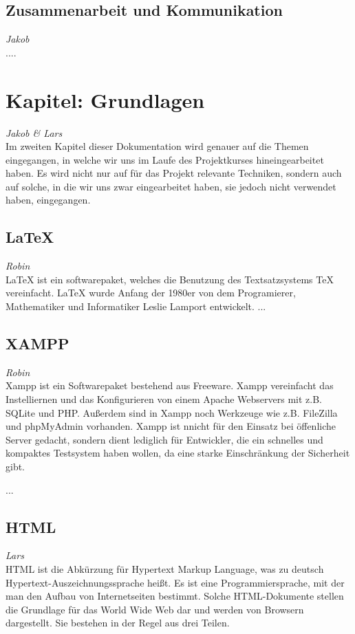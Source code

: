 \documentclass[12pt,a4paper,bibliography=totocnumbered,listof=totocnumbered]{scrartcl}
\begin{document}
\subsection{Zusammenarbeit und Kommunikation}
\emph{Jakob}\\
....

\pagebreak

\section{Kapitel: Grundlagen}
\emph{Jakob \emph{\&} Lars}\\
Im zweiten Kapitel dieser Dokumentation wird genauer auf die Themen eingegangen, in welche wir uns im Laufe des Projektkurses hineingearbeitet haben. Es wird nicht nur auf für das Projekt relevante Techniken, sondern auch auf solche, in die wir uns zwar eingearbeitet haben, sie jedoch nicht verwendet haben, eingegangen.

\subsection{LaTeX}
\label{sec:LaTeX}
\emph{Robin}\\
LaTeX ist ein softwarepaket, welches die Benutzung des Textsatzsystems TeX vereinfacht. LaTeX wurde Anfang der 1980er von dem Programierer, Mathematiker und Informatiker Leslie Lamport entwickelt.\cite{LaTeX}\cite{Lamport}
...

\subsection{XAMPP}
\label{sec:XAMPP}
\emph{Robin}\\
Xampp ist ein Softwarepaket bestehend aus Freeware. Xampp vereinfacht das Instelliernen und das Konfigurieren von einem Apache Webservers mit z.B. SQLite und PHP. Außerdem sind in Xampp noch Werkzeuge wie z.B. FileZilla und phpMyAdmin vorhanden. Xampp ist nnicht für den Einsatz bei öffenliche Server gedacht, sondern dient lediglich für Entwickler, die ein schnelles und kompaktes Testsystem haben wollen, da eine starke Einschränkung der Sicherheit gibt.\cite{XAMPP}

...

\subsection{HTML}
\label{sec:HTML}
\emph{Lars}\\
HTML ist die Abkürzung für \glqq Hypertext Markup Language\grqq, was zu deutsch \glqq Hypertext-Auszeichnungssprache\grqq{} heißt. Es ist eine Programmiersprache, mit der man den Aufbau von Internetseiten bestimmt. Solche HTML-Dokumente stellen die Grundlage für das World Wide Web dar und werden von Browsern dargestellt.\cite{HTML}\cite{Hypertext_Markup_Language} Sie bestehen in der Regel aus drei Teilen.\cite{HTML/Dokumentstruktur_und_Aufbau} 
\end{document}
